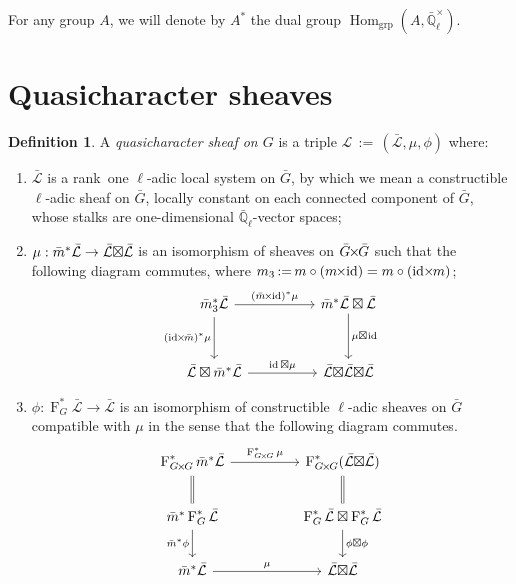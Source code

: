 \documentclass[11pt]{amsart}
\makeatletter
\theoremstyle{plain}
\theoremstyle{definition}
\newtheorem{definition}[theorem]{Definition}
\theoremstyle{remark}
\newcommand{\EE}{\mathbb{\bar Q}_\ell}
\newcommand{\EEx}{\EE^\times}
\newcommand{\Frob}[1]{\operatorname{F}_{#1}}
\DeclareMathOperator{\Hom}{Hom}
\DeclareMathOperator{\id}{id}
\newcommand{\ceq}{{\, :=\, }}
\newcommand{\qcs}[1]{{\mathcal{#1}}}
\newcommand{\gqcs}[1]{{\mathcal{\bar #1}}}
\newcommand{\labitem}[2]{%
\def\@itemlabel{\textbf{#1}}
\item
\def\@currentlabel{#1}\label{#2}}
\newcommand{\bm}{\bar{m}}
\newcommand{\bG}{\bar{G}}
\newcommand{\tight}[3]{\hspace{-#1pt}{#2}\hspace{-#3pt}}
\newcommand{\bGxG}{\text{$\bar{G} \tight{1}{\times}{1} \bar{G}$}}
\newcommand{\GxxG}{\text{$G \tight{1}{\times}{1} G$}}
\newcommand{\LxL}{\text{$\gqcs{L} \tight{0}{\boxtimes}{0} \gqcs{L}$}}
\makeatother
\begin{document}
For any group $A$, we will denote by $A^*$ the dual group $\Hom_\text{grp}(A, \EEx)$.

\section{Quasicharacter sheaves}\label{sec:category}

\begin{definition}\label{def:QC}
A \emph{quasicharacter sheaf on $G$} is a triple
$\qcs{L}\ceq (\gqcs{L},\mu,\phi)$ where:
\begin{enumerate}
\labitem{(CS.1)}{CS.1} $\gqcs{L}$ is a rank~one $\ell$-adic local system on $\bG$, by which we mean
a constructible $\ell$-adic sheaf on $\bG$, locally constant on each connected component of $\bG$, whose stalks are one-dimensional $\EE$-vector spaces; 
\labitem{(CS.2)}{CS.2} $\mu: \bm^* \gqcs{L} \to \LxL$ is an isomorphism of sheaves on $\bGxG$ such that the following diagram commutes, 
  where $m_3 \ceq m\circ (m\tight{1}{\times}{2}\id) = m\circ (\id\tight{2}{\times}{1} m)$;
%
  \[
  \begin{tikzcd}[row sep=30]
  \bm_3^*\gqcs{L} \arrow{rr}{(\bm \tight{1}{\times}{2} \id)^*\mu} \arrow[swap]{d}{(\id \tight{2}{\times}{1} \bm)^*\mu}
    &&  \bm^*\gqcs{L} \boxtimes \gqcs{L} \dar{\mu \tight{0}{\boxtimes}{1} \id} \\
    \gqcs{L} \boxtimes \bm^* \gqcs{L} \arrow{rr}{\id \boxtimes \mu}
    &&  \gqcs{L} \tight{0}{\boxtimes}{0} \LxL
  \end{tikzcd}
  \]
%
\labitem{(CS.3)}{CS.3} $\phi : \Frob{G}^* \gqcs{L} \to \gqcs{L}$ is an
  isomorphism of constructible $\ell$-adic sheaves on $\bG$ compatible with $\mu$ in the sense that the following diagram commutes.
%
  \[
  \begin{tikzcd}[row sep=20]
  \Frob{\GxxG}^* \bm^* \gqcs{L} \arrow{rr}{\Frob{\GxxG}^*\mu}
    && \Frob{\GxxG}^*(\LxL)\\
    \arrow[equal]{u} \bm^*  \Frob{G}^* \gqcs{L} \arrow[swap]{d}{\bm^* \phi}
    && \Frob{G}^*\gqcs{L}\boxtimes \Frob{G}^*\gqcs{L} \dar{\phi\boxtimes \phi} \arrow[equal]{u} \\
    \bm^*\gqcs{L} \arrow{rr}{\mu}
    && \LxL
  \end{tikzcd}
  \]
\end{enumerate}
\end{definition}
\end{document}

